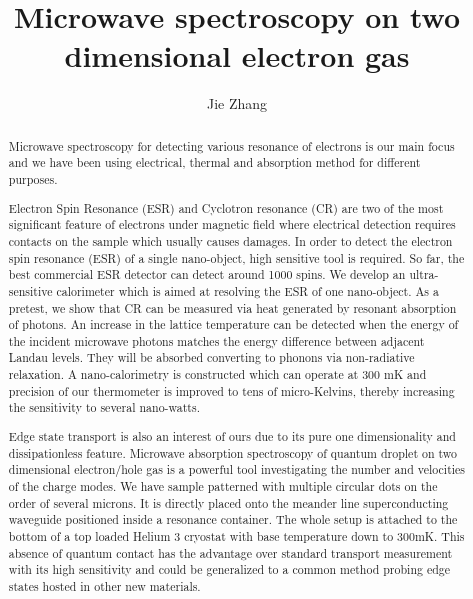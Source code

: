 \documentclass[12pt]{ruthesis}
\title{Microwave spectroscopy on two dimensional electron gas}
\author{Jie Zhang}
\begin{document}
  \begin{frontmatter}
   \maketitle

\begin{abstract}

Microwave spectroscopy for detecting various resonance  of electrons is our main focus and we have been using electrical, thermal and absorption method for different purposes.  

Electron Spin Resonance (ESR) and Cyclotron resonance (CR) are two of the most significant feature of electrons under magnetic field where electrical detection requires contacts on the sample which usually causes damages. In order to detect the electron spin resonance (ESR) of a single nano-object, high sensitive tool is required. So far, the best commercial ESR detector can detect around 1000 spins. We develop an ultra-sensitive calorimeter which is aimed at resolving the ESR of one nano-object. As a pretest, we show that CR can be measured via heat generated by resonant absorption of photons. An increase in the lattice temperature can be detected when the energy of the incident microwave photons matches the energy difference between adjacent Landau levels. They will be absorbed converting to phonons via non-radiative relaxation. A nano-calorimetry is constructed which can operate at 300 mK and precision of our thermometer is improved to tens of micro-Kelvins, thereby increasing the sensitivity to several nano-watts. 

Edge state transport is also an interest of ours due to its pure one dimensionality and dissipationless feature. Microwave absorption spectroscopy of quantum droplet on two dimensional electron/hole gas is a powerful tool investigating the number and velocities of the charge modes. We have sample patterned with multiple circular dots on the order of several microns. It is directly placed onto the meander line superconducting waveguide positioned inside a resonance container. The whole setup is attached to the bottom of a top loaded Helium 3 cryostat with base temperature down to 300mK. This absence of quantum contact has the advantage over standard transport measurement with its high sensitivity and could be generalized to a common method probing edge states hosted in other new materials.

\end{abstract}

%
\tableofcontents
\listoffigures
%   
\end{frontmatter}
\end{document}
